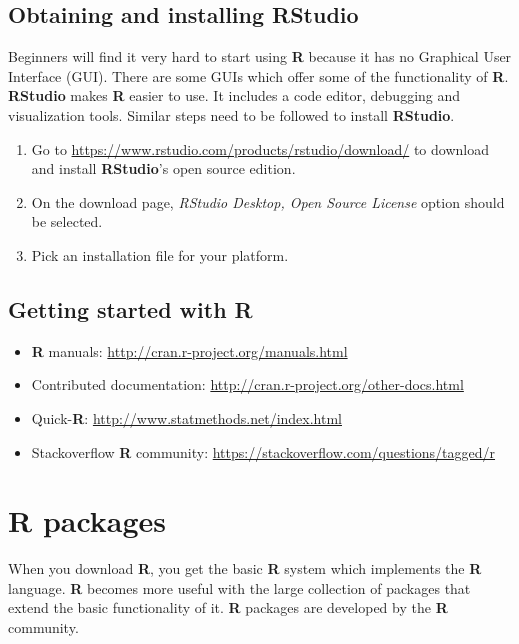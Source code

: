 \documentclass[10pt,b5paper,]{book}
\providecommand{\tightlist}{%
  \setlength{\itemsep}{0pt}\setlength{\parskip}{0pt}}
\theoremstyle{definition}
\theoremstyle{definition}
\theoremstyle{definition}
\theoremstyle{remark}
\begin{document}
\hypertarget{obtaining-and-installing-rstudio}{%
\subsection{Obtaining and installing
RStudio}\label{obtaining-and-installing-rstudio}}

Beginners will find it very hard to start using \textbf{R} because it
has no Graphical User Interface (GUI). There are some GUIs which offer
some of the functionality of \textbf{R}. \textbf{RStudio} makes
\textbf{R} easier to use. It includes a code editor, debugging and
visualization tools. Similar steps need to be followed to install
\textbf{RStudio}.

\begin{enumerate}
\def\labelenumi{\arabic{enumi}.}
\tightlist
\item
  Go to \url{https://www.rstudio.com/products/rstudio/download/} to
  download and install \textbf{RStudio}'s open source edition.
\item
  On the download page, \emph{RStudio Desktop, Open Source License}
  option should be selected.
\item
  Pick an installation file for your platform.
\end{enumerate}

\hypertarget{getting-started-with-r}{%
\subsection{Getting started with R}\label{getting-started-with-r}}

\begin{itemize}
\tightlist
\item
  \textbf{R} manuals: \url{http://cran.r-project.org/manuals.html}
\item
  Contributed documentation:
  \url{http://cran.r-project.org/other-docs.html}
\item
  Quick-\textbf{R}: \url{http://www.statmethods.net/index.html}
\item
  Stackoverflow \textbf{R} community:
  \url{https://stackoverflow.com/questions/tagged/r}
\end{itemize}

\hypertarget{r-packages}{%
\section{R packages}\label{r-packages}}

When you download \textbf{R}, you get the basic \textbf{R} system which
implements the \textbf{R} language. \textbf{R} becomes more useful with
the large collection of packages that extend the basic functionality of
it. \textbf{R} packages are developed by the \textbf{R} community.
\end{document}
